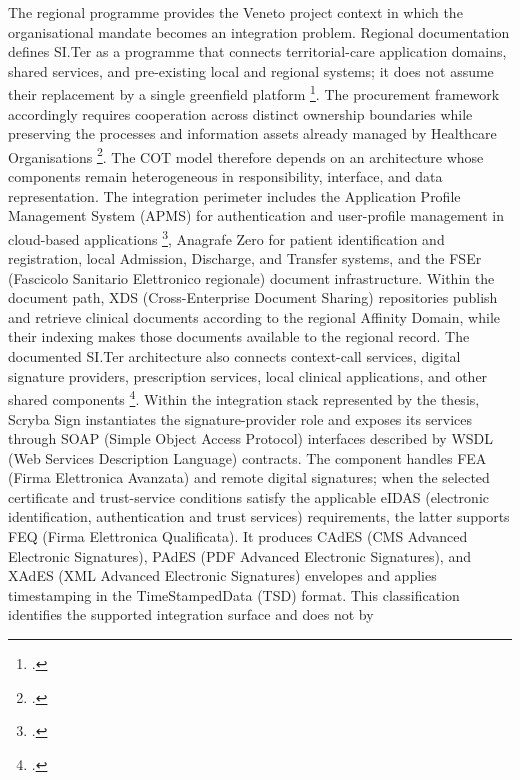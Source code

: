 \noindent The regional programme provides the Veneto project context
in which the organisational mandate becomes an integration problem. Regional
documentation defines SI.Ter as a programme that connects territorial-care
application domains, shared services, and pre-existing local and regional
systems; it does not assume their replacement by a single greenfield platform
\footcite[pp.~1--3]{regione-veneto-ddr-11922-2026}. The procurement framework
accordingly requires cooperation across distinct ownership boundaries while
preserving the processes and information assets already managed by Healthcare
Organisations \footcite{azienda-zero-siter-capitolato,rti-siter-relazione-tecnica}.
The COT model therefore depends on an architecture whose components remain
heterogeneous in responsibility, interface, and data representation. The integration perimeter includes the Application Profile Management System (APMS)
for authentication and user-profile management in cloud-based applications
\footcite[Version~1.4.1, Section~1]{apms-auth-v141}, Anagrafe Zero for patient identification and
registration, local Admission, Discharge, and Transfer systems, and the FSEr
(Fascicolo Sanitario Elettronico regionale) document infrastructure. Within the
document path, XDS (Cross-Enterprise Document Sharing) repositories publish and
retrieve clinical documents according to the regional Affinity Domain, while
their indexing makes those documents available to the regional record. The
documented SI.Ter architecture also connects context-call services, digital
signature providers, prescription services, local clinical applications, and
other shared components \footcite[Sections~2.1.2 and~2.1.4]{rti-siter-relazione-tecnica}.
Within the integration stack represented by the thesis, Scryba Sign instantiates
the signature-provider role and exposes its services through SOAP (Simple Object
Access Protocol) interfaces described by WSDL (Web Services Description
Language) contracts. The component handles FEA (Firma Elettronica Avanzata) and
remote digital signatures; when the selected certificate and trust-service
conditions satisfy the applicable eIDAS (electronic identification,
authentication and trust services) requirements, the latter supports FEQ (Firma
Elettronica Qualificata). It produces CAdES (CMS Advanced Electronic Signatures),
PAdES (PDF Advanced Electronic Signatures), and XAdES (XML Advanced Electronic
Signatures) envelopes and applies timestamping in the TimeStampedData (TSD)
format. This
classification identifies the supported integration surface and does not by
